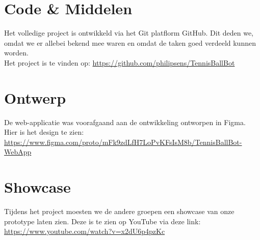 \section{Code \& Middelen}

Het volledige project is ontwikkeld via het Git platflorm GitHub. Dit deden we, omdat we er allebei bekend mee waren en omdat de taken goed verdeeld kunnen worden.\\ 

Het project is te vinden op: \url{https://github.com/philipsens/TennisBallBot}

\section{Ontwerp}
De web-applicatie was voorafgaand aan de ontwikkeling ontworpen in Figma. Hier is het design te zien: \url{https://www.figma.com/proto/mFk9zdLfH7LoPvKFsIsM8b/TennisBallBot-WebApp}

\section{Showcase}
Tijdens het project moesten we de andere groepen een showcase van onze prototype laten zien. Deze is te zien op YouTube via deze link: \url{https://www.youtube.com/watch?v=x2dU6p4pzKc}